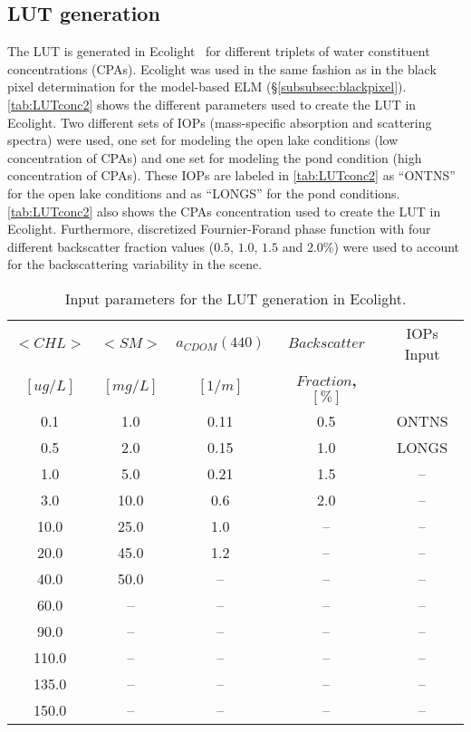 \subsection{LUT generation}
The LUT is generated in Ecolight~\cite{MobleyHE} for different triplets of water constituent concentrations (CPAs). Ecolight was used in the same fashion as in the black pixel determination for the model-based ELM (\S\ref{subsubsec:blackpixel}). \autoref{tab:LUTconc2} shows the different parameters used to create the LUT in Ecolight. Two different sets of IOPs (mass-specific absorption and scattering spectra) were used, one set for modeling the open lake conditions (low concentration of CPAs) and one set for modeling the pond condition (high concentration of CPAs). These IOPs are labeled in \autoref{tab:LUTconc2} as ``ONTNS'' for the open lake conditions and as ``LONGS'' for the pond conditions. \autoref{tab:LUTconc2} also shows the CPAs concentration used to create the LUT in Ecolight. Furthermore, discretized Fournier-Forand phase function with four different backscatter fraction values ($0.5$, $1.0$, $1.5$ and $2.0\%$) were used to account for the backscattering variability in the scene.


\begin{table}[htb]
\caption{ Input parameters for the LUT generation in Ecolight. \label{tab:LUTconc2} } 
\centering
		\begin{tabular}{c|c|c|c|c}
        		\bfseries{$<CHL>$}  	& \bfseries{$<SM>$}  & \bfseries{$a_{CDOM}(440)$} & \bfseries{$Backscatter$} & IOPs Input\\
		$[ug/L]$  		& $[mg/L]$ & 	$[1/m]$ &	\bfseries{$Fraction$}, $[\%]$	\\ \hline \hline
0.1   & 1.0  &  0.11 &  0.5 & ONTNS\\
0.5   & 2.0  &  0.15 &  1.0 & LONGS\\
1.0   & 5.0  &  0.21 &  1.5 & --\\
3.0   & 10.0 &  0.6  &  2.0 & --\\
10.0  & 25.0 &  1.0  &  --  & --\\
20.0  & 45.0 &  1.2  &  --  & --\\
40.0  & 50.0 &  --   &  --  & --\\
60.0  & --   &  --   &  --  & --\\  
90.0  & --   &  --   &  --  & --\\  
110.0 & --   &  --   &  --  & --\\  
135.0 & --   &  --   &  --  & --\\  
150.0 & --   &  --   &  --  & --\\     
	 	\end{tabular}
	\end{table}


